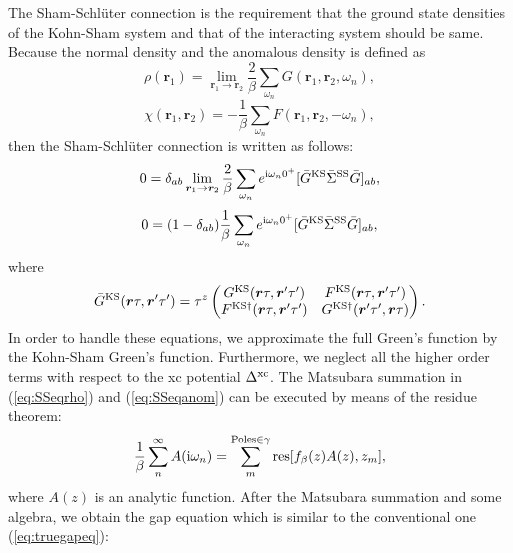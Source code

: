 The Sham-Schl\"{u}ter connection is the requirement that the ground state densities of the Kohn-Sham
system and that of the interacting system should be same.
Because the normal density and the anomalous density is defined as 
%
\begin{equation}
	\rho(\bm r_1) = \lim_{\bm r_1 \to \bm r_2}
	\frac{2}{\beta}\sum_{\omega_n}G(\bm r_1,\bm r_2,\omega_n),
	\label{eq:normaldensity}
\end{equation}
%
\begin{equation}
	\chi(\bm r_1, \bm r_2) = - \frac{1}{\beta}\sum_{\omega_n}F(\bm r_1, \bm r_2, -\omega_n),
	\label{eq:anomdensity}
\end{equation}
%
then the Sham-Schl\"{u}ter connection is written as follows:
%
\begin{equation}
	0 = \delta_{ab}\lim_{\bm r_1 \to \bm r_2} \frac{2}{\beta} 
	\sum_{\omega_n}e^{ {\rm i}\omega_n0^{+}}[\bar{G}^{\rm KS}\bar{\Sigma}^{\rm SS}\bar{G}]_{ab},
	\label{eq:SSeqrho}
\end{equation}
%
\begin{equation}
	0 = (1-\delta_{ab})\frac{1}{\beta}\sum_{\omega_n}
	e^{ {\rm i}\omega_n0^{+}}[\bar{G}^{\rm KS}\bar{\Sigma}^{\rm SS}\bar{G}]_{ab},
	\label{eq:SSeqanom}
\end{equation}
%
where
%
\begin{equation}
	\bar{G}^{\rm KS}(\bm r \tau, \bm r' \tau') = \tau^z 
	\begin{pmatrix}
		G^{\rm KS}(\bm r \tau, \bm r' \tau')  &   F^{\rm KS}(\bm r \tau, \bm r' \tau')   \\
		F^{\rm KS\dag}(\bm r \tau, \bm r' \tau')  & G^{\rm KS\dag}(\bm r' \tau', \bm r \tau)
	\end{pmatrix}.
	\label{eq:SFself}
\end{equation}
%
In order to handle these equations, we approximate the full Green's function by the Kohn-Sham
Green's function. Furthermore, we neglect all the higher order terms with respect to the xc potential
$\Delta^{\rm xc}$. The Matsubara summation in (\ref{eq:SSeqrho}) and (\ref{eq:SSeqanom}) can be
executed by means of the residue theorem:
%
\begin{equation}
	\frac{1}{\beta} \sum_{n}^{\infty}A({\rm i}\omega_n) = 
	\sum_{m}^{{\rm Poles} \in \gamma} {\rm res}[f_{\beta}(z)A(z),z_{m}],
	\label{eq:residue}
\end{equation}
%
where $A(z)$ is an analytic function. After the Matsubara summation and some algebra, we obtain
the gap equation which is similar to the conventional one (\ref{eq:truegapeq}):
